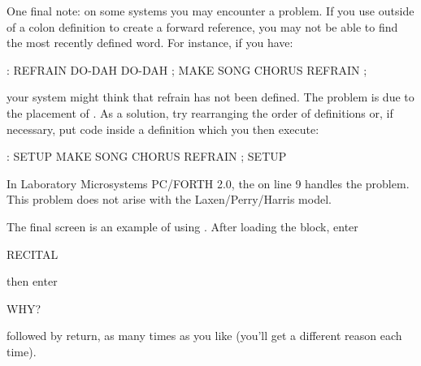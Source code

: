 One final note:  on some systems you may encounter a problem.  If you use
 outside of a colon definition to create a forward reference,
you may not be able to find the most recently defined word.  For instance,
if you have:
\begin{Code}
: REFRAIN   DO-DAH  DO-DAH ;
MAKE SONG  CHORUS  REFRAIN ;
\end{Code}
your system might think that refrain has not been defined.  The problem is
due to the placement of .  As a solution, try rearranging
the order of definitions or, if necessary, put  code inside a 
definition which you then execute:
\begin{Code}
: SETUP   MAKE SONG  CHORUS  REFRAIN ;   SETUP
\end{Code}
In Laboratory Microsystems PC/FORTH 2.0, the  on line 9
handles the problem.  This problem does not arise with the
Laxen/Perry/Harris model.

The final screen is an example of using .  After loading
the block, enter
\begin{Code}
RECITAL
\end{Code}
then enter 
\begin{Code}
WHY?
\end{Code}
followed by return, as many times as you like (you'll get a different
reason each time).


